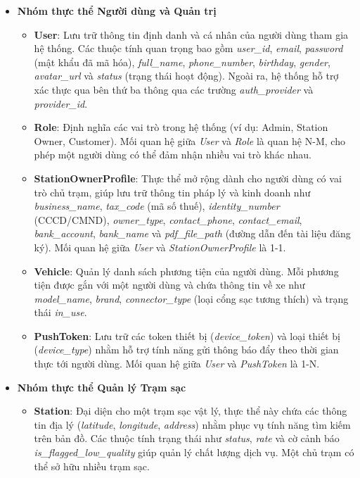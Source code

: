 \begin{itemize}
  \item \textbf{Nhóm thực thể Người dùng và Quản trị}
    \begin{itemize}
      \item \textbf{User}: Lưu trữ thông tin định danh và cá nhân của người dùng tham gia hệ thống. Các thuộc tính quan trọng bao gồm \textit{user\_id}, \textit{email}, \textit{password} (mật khẩu đã mã hóa), \textit{full\_name}, \textit{phone\_number}, \textit{birthday}, \textit{gender}, \textit{avatar\_url} và \textit{status} (trạng thái hoạt động). Ngoài ra, hệ thống hỗ trợ xác thực qua bên thứ ba thông qua các trường \textit{auth\_provider} và \textit{provider\_id}.
      \item \textbf{Role}: Định nghĩa các vai trò trong hệ thống (ví dụ: Admin, Station Owner, Customer). Mối quan hệ giữa \textit{User} và \textit{Role} là quan hệ N-M, cho phép một người dùng có thể đảm nhận nhiều vai trò khác nhau.
      \item \textbf{StationOwnerProfile}: Thực thể mở rộng dành cho người dùng có vai trò chủ trạm, giúp lưu trữ thông tin pháp lý và kinh doanh như \textit{business\_name}, \textit{tax\_code} (mã số thuế), \textit{identity\_number} (CCCD/CMND), \textit{owner\_type}, \textit{contact\_phone}, \textit{contact\_email}, \textit{bank\_account}, \textit{bank\_name} và \textit{pdf\_file\_path} (đường dẫn đến tài liệu đăng ký). Mối quan hệ giữa \textit{User} và \textit{StationOwnerProfile} là 1-1.
      \item \textbf{Vehicle}: Quản lý danh sách phương tiện của người dùng. Mỗi phương tiện được gắn với một người dùng và chứa thông tin về xe như \textit{model\_name}, \textit{brand}, \textit{connector\_type} (loại cổng sạc tương thích) và trạng thái \textit{in\_use}.
      \item \textbf{PushToken}: Lưu trữ các token thiết bị (\textit{device\_token}) và loại thiết bị (\textit{device\_type}) nhằm hỗ trợ tính năng gửi thông báo đẩy theo thời gian thực tới người dùng. Mối quan hệ giữa \textit{User} và \textit{PushToken} là 1-N.
    \end{itemize}
    \item \textbf{Nhóm thực thể Quản lý Trạm sạc}
    \begin{itemize}
        \item \textbf{Station}: Đại diện cho một trạm sạc vật lý, thực thể này chứa các thông tin địa lý (\textit{latitude}, \textit{longitude}, \textit{address}) nhằm phục vụ tính năng tìm kiếm trên bản đồ. Các thuộc tính trạng thái như \textit{status}, \textit{rate} và cờ cảnh báo \textit{is\_flagged\_low\_quality} giúp quản lý chất lượng dịch vụ. Một chủ trạm có thể sở hữu nhiều trạm sạc.

\end{itemize}
\end{itemize}
